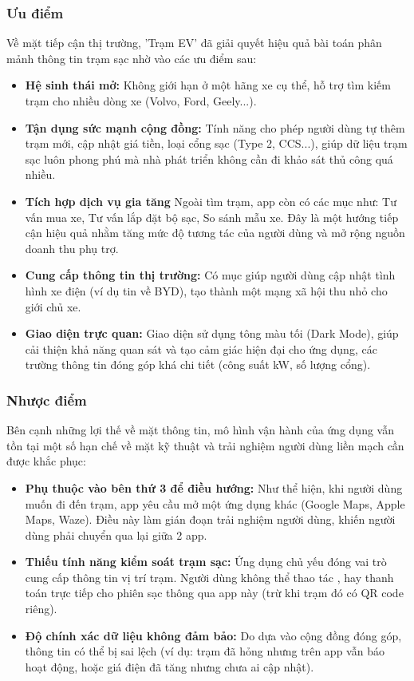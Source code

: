 \subsubsection{Ưu điểm}
Về mặt tiếp cận thị trường, 'Trạm EV' đã giải quyết hiệu quả bài toán phân mảnh thông tin trạm sạc nhờ vào các ưu điểm sau:
\begin{itemize}
    \item \textbf{Hệ sinh thái mở:} Không giới hạn ở một hãng xe cụ thể, hỗ trợ tìm kiếm trạm cho nhiều dòng xe (Volvo, Ford, Geely...).
    \item \textbf{Tận dụng sức mạnh cộng đồng:} Tính năng  cho phép người dùng tự thêm trạm mới, cập nhật giá tiền, loại cổng sạc (Type 2, CCS...), giúp dữ liệu trạm sạc luôn phong phú mà nhà phát triển không cần đi khảo sát thủ công quá nhiều.
    \item \textbf{Tích hợp dịch vụ gia tăng} Ngoài tìm trạm, app còn có các mục  như: Tư vấn mua xe, Tư vấn lắp đặt bộ sạc, So sánh mẫu xe. Đây là một hướng tiếp cận hiệu quả nhằm tăng mức độ tương tác của người dùng và mở rộng nguồn doanh thu phụ trợ.
    \item \textbf{Cung cấp thông tin thị trường:} Có mục  giúp người dùng cập nhật tình hình xe điện (ví dụ tin về BYD), tạo thành một mạng xã hội thu nhỏ cho giới chủ xe.
    \item \textbf{Giao diện trực quan:} Giao diện sử dụng tông màu tối (Dark Mode), giúp cải thiện khả năng quan sát và tạo cảm giác hiện đại cho ứng dụng, các trường thông tin đóng góp khá chi tiết (công suất kW, số lượng cổng).
\end{itemize}

\subsubsection{Nhược điểm}
Bên cạnh những lợi thế về mặt thông tin, mô hình vận hành của ứng dụng vẫn tồn tại một số hạn chế về mặt kỹ thuật và trải nghiệm người dùng liền mạch cần được khắc phục:
\begin{itemize}
    \item \textbf{Phụ thuộc vào bên thứ 3 để điều hướng:} Như thể hiện, khi người dùng muốn đi đến trạm, app yêu cầu mở một ứng dụng khác (Google Maps, Apple Maps, Waze). Điều này làm gián đoạn trải nghiệm người dùng, khiến người dùng phải chuyển qua lại giữa 2 app.
    \item \textbf{Thiếu tính năng kiểm soát trạm sạc:} Ứng dụng chủ yếu đóng vai trò cung cấp thông tin vị trí trạm. Người dùng không thể thao tác ,  hay thanh toán trực tiếp cho phiên sạc thông qua app này (trừ khi trạm đó có QR code riêng).
    \item \textbf{Độ chính xác dữ liệu không đảm bảo:} Do dựa vào cộng đồng đóng góp, thông tin có thể bị sai lệch (ví dụ: trạm đã hỏng nhưng trên app vẫn báo hoạt động, hoặc giá điện đã tăng nhưng chưa ai cập nhật).
\end{itemize}

